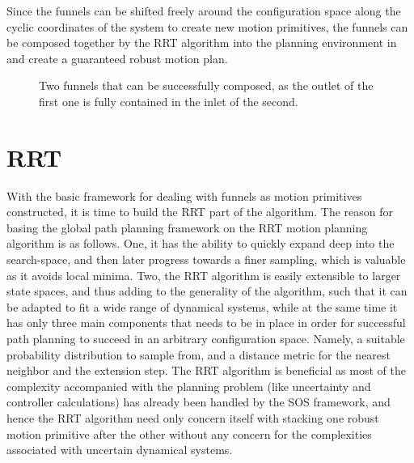 Since the funnels can be shifted freely around the configuration space along the
cyclic coordinates of the system to create new motion primitives, the funnels
can be composed together by the RRT algorithm into the planning environment in
and create a guaranteed robust motion plan.

\begin{figure}[!t]
  \caption[Two composable funnels]{Two funnels that can be successfully composed, as the outlet of the
    first one is fully contained in the inlet of the second.}
  \label{fig:two-funnels-composed}
\end{figure}

\section{RRT}
\label{sec:RRT}

With the basic framework for dealing with funnels as motion primitives
constructed, it is time to build the RRT part of the \rrtfunnel{} algorithm. The
reason for basing the global path planning framework on the RRT motion planning
algorithm is as follows. One, it has the ability to quickly expand deep into the
search-space, and then later progress towards a finer sampling, which is
valuable as it avoids local minima. Two, the RRT algorithm is easily extensible
to larger state spaces, and thus adding to the generality of the \rrtfunnel{}
algorithm, such that it can be adapted to fit a wide range of dynamical systems,
while at the same time it has only three main components that needs to be in
place in order for successful path planning to succeed in an arbitrary
configuration space. Namely, a suitable probability distribution to sample from,
and a distance metric for the nearest neighbor and the extension step. The RRT
algorithm is beneficial as most of the complexity accompanied with the planning
problem (like uncertainty and controller calculations) has already been handled
by the SOS framework, and hence the RRT algorithm need only concern itself with
stacking one robust motion primitive after the other without any concern for the
complexities associated with uncertain dynamical systems.


